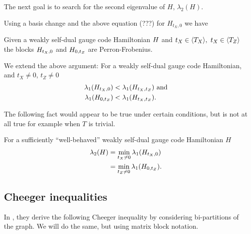 \documentclass[12pt]{article}
\renewenvironment{framed}[1][\hsize]{%
\def\FrameCommand{{\color{black}\vrule width 3pt}\hspace{0pt}\fboxsep=\FrameSep\colorbox{lightgray}}%
\MakeFramed{\hsize0.8\linewidth\advance\hsize-\width\FrameRestore}}
{\endMakeFramed}
\begin{document}

The next goal is to search for
the second eigenvalue of $H$,
$\lambda_2(H).$

Using a basis change and the
above equation (???) for $H_{t_X,0}$
we have
\begin{framed}

Given a weakly self-dual
gauge code Hamiltonian $H$ and
$t_X\in \langle T_X \rangle,\  t_X\in \langle T_Z \rangle$
the blocks $H_{t_X,0}$ and 
$H_{0,t_Z}$ are Perron-Frobenius.
\end{framed}

We extend the above argument:
\begin{framed}
For a weakly self-dual gauge code
Hamiltonian,
and $t_X\ne 0$, $t_Z\ne 0$
\begin{align*}
\lambda_1(H_{t_X,0}) &< 
    \lambda_1(H_{t_X,t_Z}) \ \mbox{and}\\
\lambda_1(H_{0,t_Z}) &< 
    \lambda_1(H_{t_X,t_Z}).
\end{align*}
\end{framed}

The following fact would appear to
be true under certain conditions,
but is not at all true
for example when $T$ is trivial.
\begin{framed}

For a sufficiently ``well-behaved''
weakly self-dual
gauge code Hamiltonian $H$
\begin{align*}
\lambda_2(H) 
    &= \min_{t_X\ne 0} \lambda_1(H_{t_X,0})\\
    &= \min_{t_Z\ne 0} \lambda_1(H_{0,t_Z}).
\end{align*}
\end{framed}

\subsection{Cheeger inequalities}

In \cite{Friedland2002}, they derive the following Cheeger inequality
by considering bi-partitions of the graph. We will do the
same, but using matrix block notation.
\end{document}
